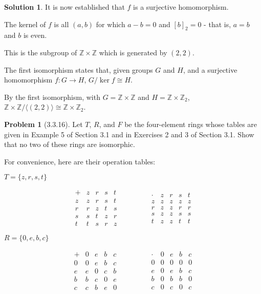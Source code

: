 \documentclass[12pt]{article}
\theoremstyle{definition}
\newtheorem*{prob}{Problem}
\newtheorem*{soln}{Solution}
\newcommand{\ZZ}{{\mathbb{Z}}}
\renewcommand{\ker}{\operatorname{ker}}
\begin{document}
\begin{soln}
It is now established that $f$ is a surjective homomorphism.

The kernel of $f$ is all $(a, b)$ for which $a-b=0$ and $[b]_2=0$ -
that is, $a=b$ and $b$ is even.

This is the subgroup of $\ZZ\times\ZZ$ which is generated by $(2,2)$.

The first isomorphism states that,
given groups $G$ and $H$,
and a surjective homomorphism $f: G\to H$,
$G/\ker f\cong H$.

By the first isomorphism,
with $G=\ZZ\times\ZZ$ and $H=\ZZ\times\ZZ_2$,
$\ZZ\times\ZZ/\langle (2,2) \rangle \cong \ZZ\times\ZZ_2$.

\end{soln}


\begin{prob}[3.3.16]
Let $T$, $R$, and $F$ be the four-element rings whose tables are given in Example 5 of  
Section 3.1 and in Exercises 2 and 3 of  Section 3.1. 
Show that no two of  these rings are isomorphic.

For convenience, here are their operation tables:

$T = \{z,r,s,t \}$

\[
\begin{array}{c|cccc}
+ & z & r & s & t \\
\hline
z      & z & r & s & t  \\
r      & r & z & t & s  \\
s      & s & t & z & r  \\
t      & t & s & r & z 
\end{array}
\qquad\qquad
\begin{array}{c|cccc}
\cdot & z & r & s & t \\
\hline
z      & z & z & z & z  \\
r      & z & z & r & r  \\
s      & z & z & s & s  \\
t      & z & z & t & t 
\end{array}
\]

$R = \{ 0, e, b, c \}$

\[
\begin{array}{c|cccc}
+ & 0 & e & b & c \\
\hline
0      & 0 & e & b & c  \\
e      & e & 0 & c & b  \\
b      & b & c & 0 & e  \\
c      & c & b & e & 0 
\end{array}
\qquad\qquad
\begin{array}{c|cccc}
\cdot & 0 & e & b & c \\
\hline
0      & 0 & 0 & 0 & 0  \\
e      & 0 & e & b & c  \\
b      & 0 & b & b & 0  \\
c      & 0 & c & 0 & c 
\end{array}
\]


\end{prob}
\end{document}
